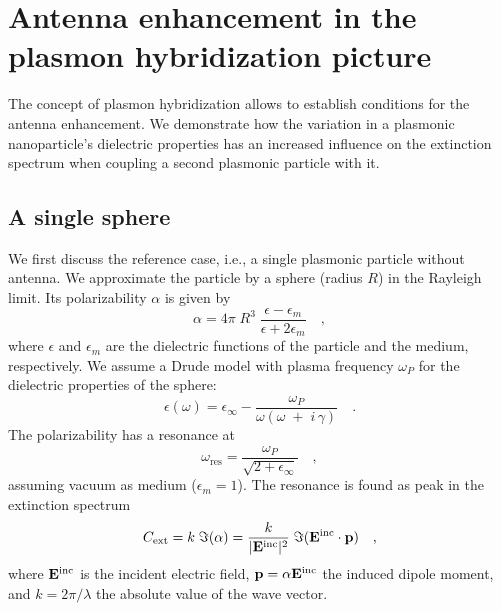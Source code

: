  
\section{Antenna enhancement in the plasmon hybridization picture}

The concept of plasmon hybridization allows to establish conditions for the
antenna enhancement. We demonstrate how the variation in a  plasmonic nanoparticle's dielectric properties has an increased influence on the extinction spectrum when coupling a second plasmonic particle with it.

\subsection{A single sphere}

\newcommand{\Evec}{{\bf E}}
\newcommand{\pvec}{{\bf p}}
\newcommand{\rvec}{{\bf r}}

We first discuss the reference case, i.e., a single plasmonic particle without
antenna. We approximate the particle by a sphere (radius $R$) in the Rayleigh limit. Its
polarizability $\alpha$ is given by
%
\begin{equation}
 \alpha = 4 \pi  \; R^3 \; \frac{\epsilon - \epsilon_m}{\epsilon +
2 \epsilon_m} \quad ,
\end{equation}
%
where $\epsilon$ and $\epsilon_m$ are the dielectric functions of the particle
and the medium, respectively.
We assume a Drude model with plasma frequency $\omega_P$ for the dielectric
properties of the sphere:
%
\begin{equation}
 \epsilon(\omega) = \epsilon_{\infty} - \frac{\omega_P}{ \omega \left(\omega \;
+ \; i\, \gamma \right) } \quad .
\end{equation}
%
The polarizability has a resonance at 
%
\begin{equation} 
 \omega_{\text{res}} = \frac{\omega_P}{\sqrt{2 + \epsilon_{\infty}} }  \quad ,
\end{equation}
%
assuming vacuum as medium ($\epsilon_m = 1$). The resonance is found as peak in
the extinction spectrum
%
\begin{equation} 
 C_{\text{ext}} = k \; \Im(\alpha) = \frac{k}{|\Evec^{\text{inc}}|^2} \; \Im(\Evec^{\text{inc}}\cdot  \bf{p}) \quad ,
\end{equation}
%
where $\Evec^{\text{inc}}$ is the incident electric field, $\bf{p} = \alpha \Evec^{\text{inc}}$ the induced
dipole moment, and $k = 2 \pi / \lambda $ the absolute value of the wave vector.

